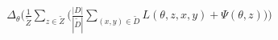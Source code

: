 \documentclass[preview]{standalone}
\begin{document}
\begin{align*}
\Delta_{\theta} \big (\frac{1}{\tilde Z} \sum_{z \in \tilde Z} \big( \frac{|D|}{|\tilde D |} \sum_{(x,y) \in \tilde D} L (\theta, z, x, y) + \Psi (\theta, z) \big)\big)
\end{align*}
\end{document}
